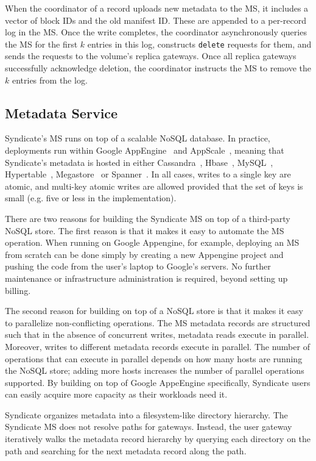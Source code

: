 When the coordinator of a record uploads new metadata to the MS, it includes a
vector of block IDs and the old manifest ID.  These are appended to a per-record
log in the MS.  Once the write completes, the coordinator asynchronously queries
the MS for the first $k$ entries in this log, constructs \texttt{delete}
requests for them, and sends the requests to the volume's replica gateways.
Once all replica gateways successfully acknowledge deletion, the coordinator
instructs the MS to remove the $k$ entries from the log.

\subsection{Metadata Service}

Syndicate's MS runs on top of a scalable NoSQL database.  In practice, 
deployments run within Google AppEngine~\cite{google-appengine} and
AppScale~\cite{appscale}, meaning that
Syndicate's metadata is hosted in either Cassandra~\cite{cassandra},
Hbase~\cite{hbase}, MySQL~\cite{mysql}, Hypertable~\cite{hypertable}, Megastore~\cite{megastore} or
Spanner~\cite{spanner}.  In all cases, writes to a single key are atomic, and
multi-key atomic writes are allowed provided that the set of keys is small (e.g.
five or less in the implementation).

There are two reasons for building the Syndicate MS on top of a third-party NoSQL store.
The first reason is that it makes it easy to automate the MS operation.
When running on Google Appengine, for example, deploying an MS from
scratch can be done simply by creating a new Appengine project and pushing the
code from the user's laptop to Google's servers.  No further maintenance or
infrastructure administration is required, beyond setting up billing.

The second reason for building on top of a NoSQL store is that it makes it easy
to parallelize non-conflicting operations.  The MS metadata records are
structured such that in the absence of concurrent writes,
metadata reads execute in parallel.  Moreover, writes to different metadata
records execute in parallel.  The number of operations that can execute in
parallel depends on how many hosts are running the NoSQL store; adding more
hosts increases the number of parallel operations supported.  By building on top
of Google AppeEngine specifically, Syndicate users can easily acquire more capacity as
their workloads need it.

Syndicate organizes metadata into a filesystem-like directory hierarchy.
The Syndicate MS does not resolve paths for gateways.  Instead, the user
gateway iteratively walks the metadata record hierarchy by querying each
directory on the path and searching for the next metadata record along the path.

